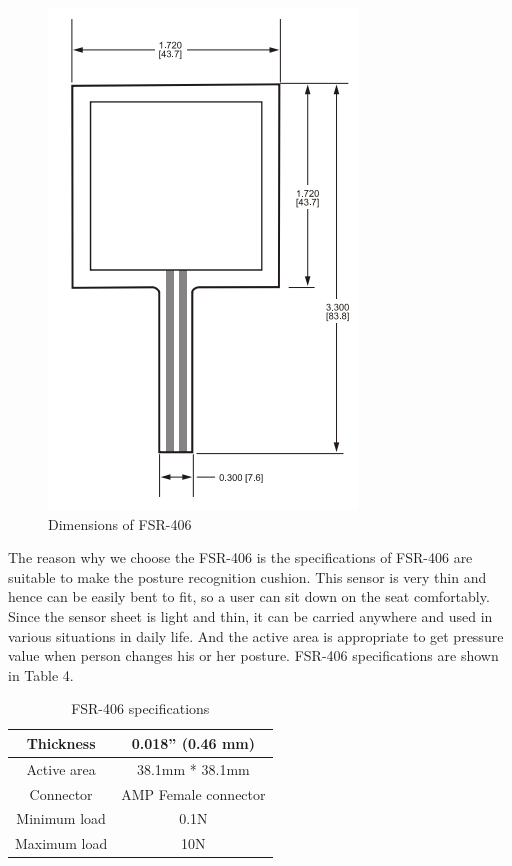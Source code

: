 \documentclass[conference]{IEEEtran}
\begin{document}
\begin{figure}[H]
\begin{center}
    \includegraphics[scale=0.6]{img_06.png}
    \caption{Dimensions of FSR-406} 
\end{center}
\end{figure}

The reason why we choose the FSR-406 is the specifications of FSR-406 are suitable to make the posture recognition cushion. This sensor is very thin and hence can be easily bent to fit, so a user can sit down on the seat comfortably. Since the sensor sheet is light and thin, it can be carried anywhere and used in various situations in daily life. And the active area is appropriate to get pressure value when person changes his or her posture. FSR-406 specifications are shown in Table 4.

 \begin{table}[h]
{\renewcommand\arraystretch{1.25}
\caption{FSR-406 specifications}
\begin{tabular}{|c|cc}  \hline\hline
Thickness& \multicolumn{2}{p{6cm}|}{\raggedright 0.018'' (0.46 mm)} \\ \hline
Active area& \multicolumn{2}{p{6cm}|}{\raggedright 38.1mm * 38.1mm} \\ \hline
Connector& \multicolumn{2}{p{6cm}|}{\raggedright AMP Female connector} \\ \hline
Minimum load& \multicolumn{2}{p{6cm}|}{\raggedright 0.1N} \\ \hline
Maximum load& \multicolumn{2}{p{6cm}|}{\raggedright 10N} \\ \hline \hline
\end{tabular}}
\end{table}
\end{document}

